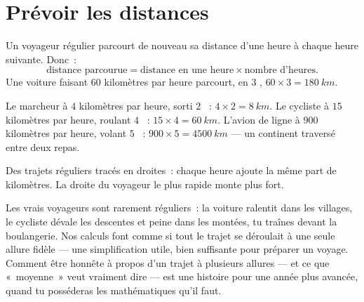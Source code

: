 \section{Prévoir les distances}

\begin{proposition}\label{prop:g5:speed-distance-time:distance}
Un voyageur régulier parcourt de nouveau sa distance d'une heure à
chaque heure suivante. Donc~:
\[
\text{distance parcourue} = \text{distance en une heure} \times
\text{nombre d'heures}.
\]
Une voiture faisant $60$ kilomètres par heure parcourt, en $3$
, $60 \times 3 = \qty{180}{km}$.
\end{proposition}

\begin{example}\label{ex:g5:speed-distance-time:journeys}
Le marcheur à $4$ kilomètres par heure, sorti $2$ ~:
$4 \times 2 = \qty{8}{km}$. Le cycliste à $15$ kilomètres par heure,
roulant $4$ ~: $15 \times 4 = \qty{60}{km}$. L'avion de ligne à
$900$ kilomètres par heure, volant $5$ ~:
$900 \times 5 = \qty{4500}{km}$ --- un continent traversé entre deux
repas.
\end{example}

\begin{omfigure}

{\small Des trajets réguliers tracés en droites~: chaque heure ajoute
la même part de kilomètres. La droite du voyageur le plus rapide
monte plus fort.}
\end{omfigure}

\begin{remark}\label{rem:g5:speed-distance-time:steady}
Les vrais voyageurs sont rarement réguliers~: la voiture ralentit
dans les villages, le cycliste dévale les descentes et peine dans les
montées, tu traînes devant la boulangerie. Nos calculs font comme si
tout le trajet se déroulait à une seule allure fidèle --- une
simplification utile, bien suffisante pour préparer un voyage.
Comment être honnête à propos d'un trajet à plusieurs allures --- et
ce que «~moyenne~» veut vraiment dire --- est une histoire pour une
année plus avancée, quand tu posséderas les mathématiques qu'il
faut.
\end{remark}

